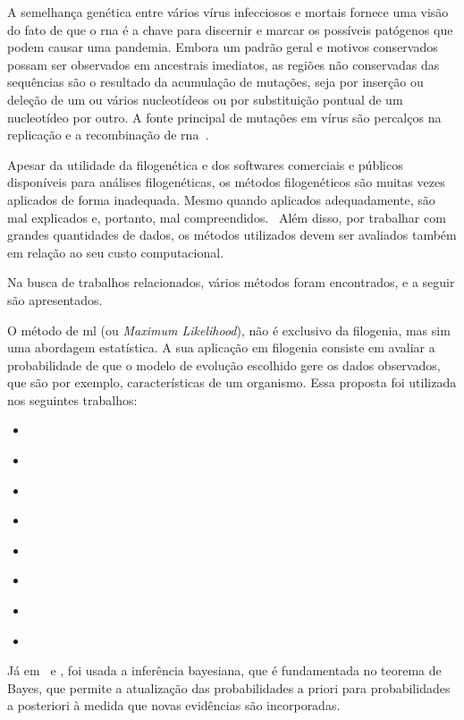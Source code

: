 A semelhança genética entre vários vírus infecciosos e mortais fornece uma visão do fato de que o \gls{rna} é a chave para discernir e marcar os possíveis patógenos que podem causar uma pandemia. Embora um padrão geral e motivos conservados possam ser observados em ancestrais imediatos, as regiões não conservadas das sequências são o resultado da acumulação de mutações, seja por inserção ou deleção de um ou vários nucleotídeos ou por substituição pontual de um nucleotídeo por outro. A fonte principal de mutações em vírus são percalços na replicação e a recombinação de \gls{rna}~\cite{behl_threat_2022}.

Apesar da utilidade da filogenética e dos softwares comerciais e públicos disponíveis para análises filogenéticas, os métodos filogenéticos são muitas vezes aplicados de forma inadequada. Mesmo quando aplicados adequadamente, são mal explicados e, portanto, mal compreendidos.~\cite[p. 1]{barry_phylogenetic_analysis_2006} Além disso, por trabalhar com grandes quantidades de dados, os métodos utilizados devem ser avaliados também em relação ao seu custo computacional.

Na busca de trabalhos relacionados, vários métodos foram encontrados, e a seguir são apresentados.

O método de \gls{ml} (ou \textit{Maximum Likelihood}), não é exclusivo da filogenia, mas sim uma abordagem estatística. A sua aplicação em filogenia consiste em avaliar a probabilidade de que o modelo de evolução escolhido gere os dados observados, que são por exemplo, características de um organismo. Essa proposta foi utilizada nos seguintes trabalhos:
\begin{itemize}
  \item \citeauthor{behl_threat_2022}
  \item \citeauthor{fall_genetic_diversity_2021}
  \item \citeauthor{shabbir_comprehensive_2020}
  \item \citeauthor{hudu_hepatitis_2018}
  \item \citeauthor{sallard_tracing_2021}
  \item \citeauthor{paez-espino_diversity_evolution_2019}
  \item \citeauthor{tang_evolutionary_2021}
  \item \citeauthor{cho_analysis_2022}
\end{itemize}

Já em~\citeauthor{yin_systematic_2019} e \citeauthor{bedoya-pilozo_molecular_epidemiology_2018}, foi usada a inferência bayesiana, que é fundamentada no teorema de Bayes, que permite a atualização das probabilidades a priori para probabilidades a posteriori à medida que novas evidências são incorporadas.

